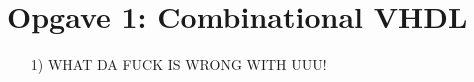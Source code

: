 \section{Opgave 1: Combinational VHDL}
\begin{enumerate}
	\item[1)]
WHAT DA FUCK IS WRONG WITH UUU!
	
\end{enumerate}